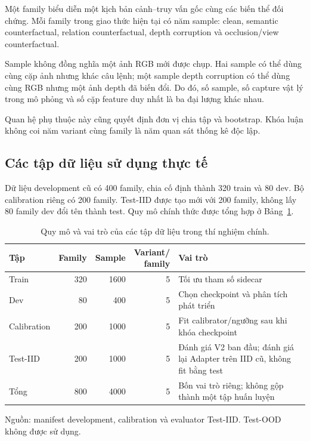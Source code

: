 Một family biểu diễn một kịch bản cảnh--truy vấn gốc cùng các biến
thể đối chứng. Mỗi family trong giao thức hiện tại có năm sample:
clean, semantic counterfactual, relation counterfactual, depth
corruption và occlusion/view counterfactual.

Sample không đồng nghĩa một ảnh RGB mới được chụp. Hai sample
có thể dùng cùng cặp ảnh nhưng khác câu lệnh; một sample depth
corruption có thể dùng cùng RGB nhưng một ảnh depth đã biến đổi.
Do đó, số sample, số capture vật lý trong mô phỏng và số cặp
feature duy nhất là ba đại lượng khác nhau.

Quan hệ phụ thuộc này cũng quyết định đơn vị chia tập và bootstrap.
Khóa luận không coi năm variant cùng family là năm quan sát
thống kê độc lập.

\subsection{Các tập dữ liệu sử dụng thực tế}

Dữ liệu development cũ có 400 family, chia cố định thành 320
train và 80 dev. Bộ calibration riêng có 200 family.
Test-IID được tạo mới với 200 family, không lấy 80 family dev
đổi tên thành test. Quy mô chính thức được tổng hợp ở
Bảng~\ref{tab:setup-splits}.

\begin{table}[htbp]
    \centering
    \setlength{\tabcolsep}{4pt}
    \renewcommand{\arraystretch}{1.15}
    \caption{Quy mô và vai trò của các tập dữ liệu trong thí nghiệm chính.}
    \label{tab:setup-splits}
    \small
    \begin{tabularx}{\textwidth}{@{}lrrr>{\raggedright\arraybackslash}X@{}}
        \toprule
        Tập & Family & Sample & \shortstack{Variant/\\family} & Vai trò \\
        \midrule
        Train & 320 & 1600 & 5 & Tối ưu tham số sidecar \\
        Dev & 80 & 400 & 5 & Chọn checkpoint và phân tích phát triển \\
        Calibration & 200 & 1000 & 5 &
        Fit calibrator/ngưỡng sau khi khóa checkpoint \\
        Test-IID & 200 & 1000 & 5 &
        Đánh giá V2 ban đầu; đánh giá lại Adapter trên IID cũ, không fit bằng test \\
        \midrule
        Tổng & 800 & 4000 & 5 &
        Bốn vai trò riêng; không gộp thành một tập huấn luyện \\
        \bottomrule
    \end{tabularx}
    \vspace{2pt}
    {\footnotesize\raggedright Nguồn: manifest development, calibration và
    evaluator Test-IID. Test-OOD không được sử dụng.\par}
\end{table}

